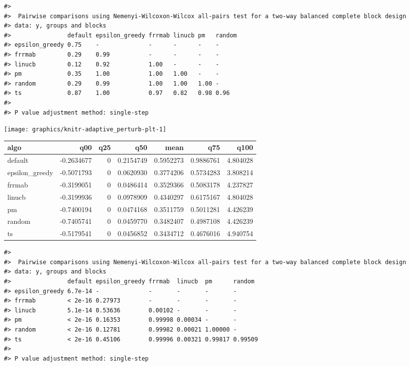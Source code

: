 \documentclass[
]{article}
\begin{document}
\begin{verbatim}
#> 
#>  Pairwise comparisons using Nemenyi-Wilcoxon-Wilcox all-pairs test for a two-way balanced complete block design
#> data: y, groups and blocks
#>                default epsilon_greedy frrmab linucb pm   random
#> epsilon_greedy 0.75    -              -      -      -    -     
#> frrmab         0.29    0.99           -      -      -    -     
#> linucb         0.12    0.92           1.00   -      -    -     
#> pm             0.35    1.00           1.00   1.00   -    -     
#> random         0.29    0.99           1.00   1.00   1.00 -     
#> ts             0.87    1.00           0.97   0.82   0.98 0.96
#> 
#> P value adjustment method: single-step
\end{verbatim}

\begin{center}\texttt{[image: graphics/knitr-adaptive\_perturb-plt-1]} \end{center}

\begin{longtable}[]{@{}lrrrrrr@{}}
\toprule
algo & q00 & q25 & q50 & mean & q75 & q100 \\
\midrule
\endhead
default & -0.2634677 & 0 & 0.2154749 & 0.5952273 & 0.9886761 &
4.804028 \\
epsilon\_greedy & -0.5071793 & 0 & 0.0620930 & 0.3774206 & 0.5734283 &
3.808214 \\
frrmab & -0.3199051 & 0 & 0.0486414 & 0.3529366 & 0.5083178 &
4.237827 \\
linucb & -0.3199936 & 0 & 0.0978909 & 0.4340297 & 0.6175167 &
4.804028 \\
pm & -0.7400194 & 0 & 0.0474168 & 0.3511759 & 0.5011281 & 4.426239 \\
random & -0.7405741 & 0 & 0.0459770 & 0.3482407 & 0.4987108 &
4.426239 \\
ts & -0.5179541 & 0 & 0.0456852 & 0.3434712 & 0.4676016 & 4.940754 \\
\bottomrule
\end{longtable}

\begin{verbatim}
#> 
#>  Pairwise comparisons using Nemenyi-Wilcoxon-Wilcox all-pairs test for a two-way balanced complete block design
#> data: y, groups and blocks
#>                default epsilon_greedy frrmab  linucb  pm      random 
#> epsilon_greedy 6.7e-14 -              -       -       -       -      
#> frrmab         < 2e-16 0.27973        -       -       -       -      
#> linucb         5.1e-14 0.53636        0.00102 -       -       -      
#> pm             < 2e-16 0.16353        0.99998 0.00034 -       -      
#> random         < 2e-16 0.12781        0.99982 0.00021 1.00000 -      
#> ts             < 2e-16 0.45106        0.99996 0.00321 0.99817 0.99509
#> 
#> P value adjustment method: single-step
\end{verbatim}
\end{document}
